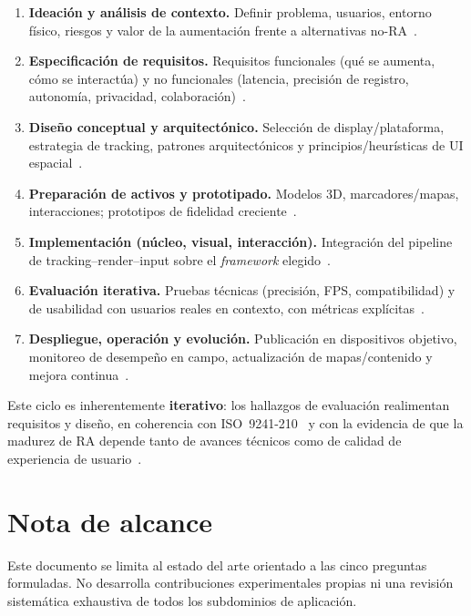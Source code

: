 \documentclass[conference]{IEEEtran}
\begin{document}
\begin{enumerate}
\item \textbf{Ideaci\'on y an\'alisis de contexto.} Definir problema, usuarios, entorno f\'isico, riesgos y valor de la aumentaci\'on frente a alternativas no-RA~\cite{devagiri2024essentials,nist2022ar}.
\item \textbf{Especificaci\'on de requisitos.} Requisitos funcionales (qu\'e se aumenta, c\'omo se interact\'ua) y no funcionales (latencia, precisi\'on de registro, autonom\'ia, privacidad, colaboraci\'on)~\cite{reicher2003architecture,sereno2022collaborative}.
\item \textbf{Dise\~no conceptual y arquitect\'onico.} Selecci\'on de display/plataforma, estrategia de tracking, patrones arquitect\'onicos y principios/heur\'isticas de UI espacial~\cite{macwilliams2004patterns,etsi_arf003,endsley2017heuristics}.
\item \textbf{Preparaci\'on de activos y prototipado.} Modelos 3D, marcadores/mapas, interacciones; prototipos de fidelidad creciente~\cite{roedavan2025mdlc,schmalstieg2016principles}.
\item \textbf{Implementaci\'on (n\'ucleo, visual, interacci\'on).} Integraci\'on del pipeline de tracking--render--input sobre el \emph{framework} elegido~\cite{roedavan2025mdlc,syed2023indepth}.
\item \textbf{Evaluaci\'on iterativa.} Pruebas t\'ecnicas (precisi\'on, FPS, compatibilidad) y de usabilidad con usuarios reales en contexto, con m\'etricas expl\'icitas~\cite{nist2022ar,dunser2011evaluating}.
\item \textbf{Despliegue, operaci\'on y evoluci\'on.} Publicaci\'on en dispositivos objetivo, monitoreo de desempe\~no en campo, actualizaci\'on de mapas/contenido y mejora continua~\cite{devagiri2024essentials}.
\end{enumerate}

Este ciclo es inherentemente \textbf{iterativo}: los hallazgos de evaluaci\'on realimentan requisitos y dise\~no, en coherencia con ISO~9241-210~\cite{iso9241_210} y con la evidencia de que la madurez de RA depende tanto de avances t\'ecnicos como de calidad de experiencia de usuario~\cite{kim2018revisiting,goh2023wearable}.

\section*{Nota de alcance}
Este documento se limita al estado del arte orientado a las cinco preguntas formuladas. No desarrolla contribuciones experimentales propias ni una revisi\'on sistem\'atica exhaustiva de todos los subdominios de aplicaci\'on.
\end{document}
